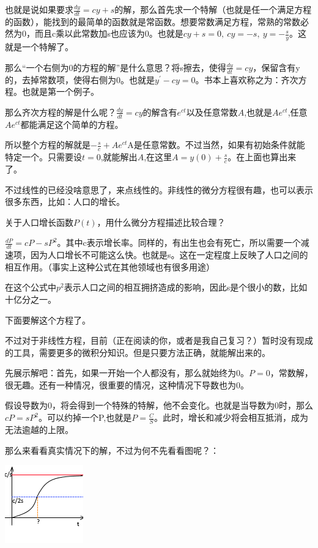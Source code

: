 \documentclass[UTF8]{ctexbook}
\newcommand{\derivative}{^\prime}
\begin{document}
{{{{  也就是说如果要求$\frac{dy}{dt} = cy + s$的解，那么首先求一个特解（也就是任一个满足方程的函数），能找到的最简单的函数就是常函数。想要常数满足方程，常熟的常数必然为0，而且c乘以此常数加s也应该为0。也就是$cy + s = 0,\ cy = -s, \ y = -\frac{s}{y}$。这就是一个特解了。

  那么“一个右侧为0的方程的解”是什么意思？将s擦去，使得$\frac{dy}{dt} = cy$，保留含有y的，去掉常数项，使得右侧为0。也就是$y\derivative - cy = 0$。书本上喜欢称之为：齐次方程。也就是第一个例子。

  那么齐次方程的解是什么呢？$\frac{dy}{dt} = cy$的解含有$e^{ct}$以及任意常数$A$,也就是$Ae^{ct}$,任意$Ae^{ct}$都能满足这个简单的方程。

  所以整个方程的解就是$-\frac{s}{c} + Ae^{ct}$A是任意常数。不过当然，如果有初始条件就能特定一个。只需要设$t = 0$,就能解出$A$,在这里$A = y(0) + \frac{s}{c}$。在上面也算出来了。

  不过线性的已经没啥意思了，来点线性的。非线性的微分方程很有趣，也可以表示很多东西，比如：人口的增长。

  关于人口增长函数$P(t)$，用什么微分方程描述比较合理？

  $\frac{dP}{dt} = cP - sP^2$。其中c表示增长率。同样的，有出生也会有死亡，所以需要一个减速项，因为人口增长不可能这么快。也就是s。这在一定程度上反映了人口之间的相互作用。（事实上这种公式在其他领域也有很多用途）

  在这个公式中$p^2$表示人口之间的相互拥挤造成的影响，因此s是个很小的数，比如十亿分之一。

  下面要解这个方程了。

  不过对于非线性方程，目前（正在阅读的你，或者是我自己复习？）暂时没有现成的工具，需要更多的微积分知识。但是只要方法正确，就能解出来的。

  先展示解吧：首先，如果一开始一个人都没有，那么就始终为0。$P = 0$，常数解，很无趣。还有一种情况，很重要的情况，这种情况下导数也为0。

  假设导数为0，将会得到一个特殊的特解，他不会变化。也就是当导数为0时，那么$cP = sP^2$。可以约掉一个P,也就是$P = \frac{C}{S}$。此时，增长和减少将会相互抵消，成为无法逾越的上限。

  那么来看看真实情况下的解，不过为何不先看看图呢？：

  \includegraphics{resources/nonLinearDifferencialEquation_HumanGrow.png}

}}}}
\end{document}
